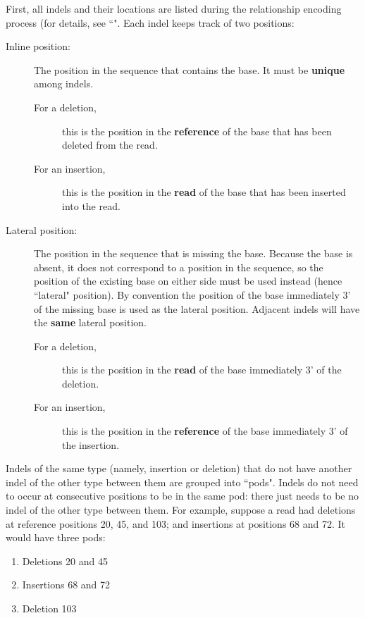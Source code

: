 \documentclass{article}
\begin{document}
First, all indels and their locations are listed during the relationship encoding process (for details, see ``".
Each indel keeps track of two positions:
\begin{description}
    \item[Inline position:] The position in the sequence that contains the base. It must be \textbf{unique} among indels.
    \begin{description}
        \item[For a deletion,] this is the position in the \textbf{reference} of the base that has been deleted from the read.
        \item[For an insertion,] this is the position in the \textbf{read} of the base that has been inserted into the read.
    \end{description}
    \item[Lateral position:] The position in the sequence that is missing the base. Because the base is absent, it does not correspond to a position in the sequence, so the position of the existing base on either side must be used instead (hence ``lateral" position). By convention the position of the base immediately 3' of the missing base is used as the lateral position. Adjacent indels will have the \textbf{same} lateral position.
    \begin{description}
        \item[For a deletion,] this is the position in the \textbf{read} of the base immediately 3' of the deletion.
        \item[For an insertion,] this is the position in the \textbf{reference} of the base immediately 3' of the insertion.
    \end{description}
\end{description} 

Indels of the same type (namely, insertion or deletion) that do not have another indel of the other type between them are grouped into ``pods".
Indels do not need to occur at consecutive positions to be in the same pod: there just needs to be no indel of the other type between them.
For example, suppose a read had deletions at reference positions 20, 45, and 103; and insertions at positions 68 and 72.
It would have three pods:
\begin{enumerate}
    \item Deletions 20 and 45
    \item Insertions 68 and 72
    \item Deletion 103
\end{enumerate}
\end{document}
